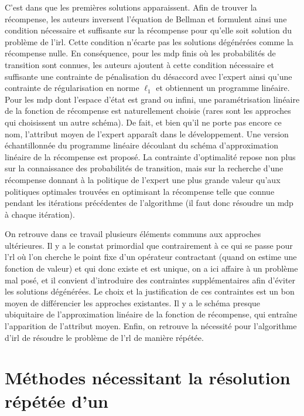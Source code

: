 \documentclass[frenchb,a4paper,justified,notoc]{tufte-book}
\begin{document}
   C'est dans \citep{ng2000algorithms} que les premières solutions apparaissent. Afin de trouver la récompense, les auteurs inversent l'équation de Bellman et formulent ainsi une condition nécessaire et suffisante sur la récompense pour qu'elle soit solution du problème de l'\gls{irl}. Cette condition n'écarte pas les solutions dégénérées comme la récompense nulle. En conséquence, pour les \gls{mdp} finis où les probabilités de transition sont connues, les auteurs ajoutent à cette condition nécessaire et suffisante une contrainte de pénalisation du désaccord avec l'expert ainsi qu'une contrainte de régularisation en norme $\ell_1$ et obtiennent un programme linéaire. Pour les \gls{mdp} dont l'espace d'état est grand ou infini, une paramétrisation linéaire de la fonction de récompense est naturellement choisie (rares sont les approches qui choisissent un autre schéma). De fait, et bien qu'il ne porte pas encore ce nom, l'attribut moyen de l'expert apparaît dans le développement. Une version échantillonnée du programme linéaire découlant du schéma d'approximation linéaire de la récompense est proposé. La contrainte d'optimalité repose non plus sur la connaissance des probabilités de transition, mais sur la recherche d'une récompense donnant à la politique de l'expert une plus grande valeur qu'aux politiques optimales trouvées en optimisant la récompense telle que connue pendant les itérations précédentes de l'algorithme (il faut donc résoudre un \gls{mdp} à chaque itération).

   On retrouve dans ce travail plusieurs éléments communs aux approches ultérieures. Il y a le constat primordial que contrairement à ce qui se passe pour l'\gls{rl} où l'on cherche le point fixe d'un opérateur contractant (quand on estime une fonction de valeur) et qui donc existe et est unique, on a ici affaire à un problème mal posé, et il convient d'introduire des contraintes supplémentaires afin d'éviter les solutions dégénérées. Le choix et la justification de ces contraintes est un bon moyen de différencier les approches existantes. Il y a le schéma presque ubiquitaire de l'approximation linéaire de la fonction de récompense, qui entraîne l'apparition de l'attribut moyen. Enfin, on retrouve la nécessité pour l'algorithme d'\gls{irl} de résoudre le problème de l'\gls{rl} de manière répétée.
\section{Méthodes nécessitant la résolution répétée d'un }
\label{sec-3-3}
\label{hier-repetee}
\end{document}
